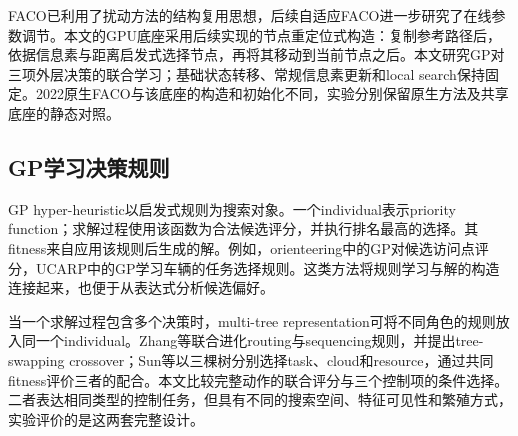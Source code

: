 FACO已利用了扰动方法的结构复用思想，后续自适应FACO进一步研究了在线参数调节\cite{skinderowicz2022,skinderowicz2024}。本文的GPU底座采用后续实现的节点重定位式构造：复制参考路径后，依据信息素与距离启发式选择节点，再将其移动到当前节点之后。本文研究GP对三项外层决策的联合学习；基础状态转移、常规信息素更新和local search保持固定。2022原生FACO与该底座的构造和初始化不同，实验分别保留原生方法及共享底座的静态对照。

\subsection{GP学习决策规则}
GP hyper-heuristic以启发式规则为搜索对象\cite{burke2013}。一个individual表示priority function；求解过程使用该函数为合法候选评分，并执行排名最高的选择。其fitness来自应用该规则后生成的解。例如，orienteering中的GP对候选访问点评分\cite{mei2018orienteering}，UCARP中的GP学习车辆的任务选择规则\cite{maclachlan2020}。这类方法将规则学习与解的构造连接起来，也便于从表达式分析候选偏好。

当一个求解过程包含多个决策时，multi-tree representation可将不同角色的规则放入同一个individual。Zhang等联合进化routing与sequencing规则，并提出tree-swapping crossover\cite{zhang2018multitree}；Sun等以三棵树分别选择task、cloud和resource，通过共同fitness评价三者的配合\cite{sun2024multicloud}。本文比较完整动作的联合评分与三个控制项的条件选择。二者表达相同类型的控制任务，但具有不同的搜索空间、特征可见性和繁殖方式，实验评价的是这两套完整设计。
